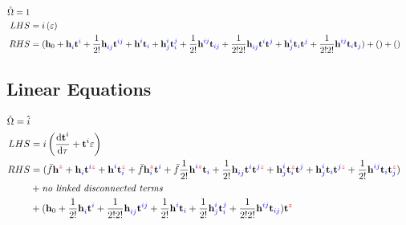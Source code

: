 \documentclass{article}
\newcommand{\bh}{\textbf{h}}
\newcommand{\bt}{\textbf{t}}
\newcommand{\down}[1]{\hat{#1}}
\begin{document}
%
%
%
%
%
%


%
%
%
%
%

\begin{align}\begin{split}
    \hat{\Omega} = 1
\\ LHS &=
    i\left(\varepsilon\right)
\\ RHS &=
%
%
(\bh_0 + \bh^{\blue{}\red{}}_{\blue{i}\red{}}\bt^{\blue{i}\red{}} + \frac{1}{2!}\bh^{\blue{}\red{}}_{\blue{ij}\red{}}\bt^{\blue{ij}\red{}} + \bh^{\blue{i}\red{}}_{\blue{}\red{}}\bt_{\blue{i}\red{}} + \bh^{\blue{i}\red{}}_{\blue{j}\red{}}\bt^{\blue{j}\red{}}_{\blue{i}\red{}} + \frac{1}{2!}\bh^{\blue{ij}\red{}}_{\blue{}\red{}}\bt_{\blue{ij}\red{}} + \frac{1}{2!2!}\bh^{\blue{}\red{}}_{\blue{ij}\red{}}\bt^{\blue{i}\red{}}\bt^{\blue{j}\red{}} + \bh^{\blue{i}\red{}}_{\blue{j}\red{}}\bt_{\blue{i}\red{}}\bt^{\blue{j}\red{}} + \frac{1}{2!2!}\bh^{\blue{ij}\red{}}_{\blue{}\red{}}\bt_{\blue{i}\red{}}\bt_{\blue{j}\red{}}) + () + ()
\end{split}\end{align}

%
%
%
%
%

\subsection{Linear Equations}

\begin{align}\begin{split}
    \hat{\Omega} = \down{i}
\\ LHS &=
    i\left(\dv{\bt^{i}_{}}{\tau} + \bt^{i}_{}\varepsilon\right)
\\ RHS &=
%
%
(\bar{f}\bh^{\blue{}\red{z}}_{\blue{}\red{}} + \bh^{\blue{}\red{}}_{\blue{i}\red{}}\bt^{\blue{i}\red{z}} + \bh^{\blue{i}\red{}}_{\blue{}\red{}}\bt^{\blue{}\red{z}}_{\blue{i}\red{}} + \bar{f}\bh^{\blue{}\red{z}}_{\blue{i}\red{}}\bt^{\blue{i}\red{}} + \bar{f}\frac{1}{2!}\bh^{\blue{i}\red{z}}_{\blue{}\red{}}\bt_{\blue{i}\red{}} + \frac{1}{2!}\bh^{\blue{}\red{}}_{\blue{ij}\red{}}\bt^{\blue{i}\red{}}\bt^{\blue{j}\red{z}} + \bh^{\blue{i}\red{}}_{\blue{j}\red{}}\bt^{\blue{}\red{z}}_{\blue{i}\red{}}\bt^{\blue{j}\red{}} + \bh^{\blue{i}\red{}}_{\blue{j}\red{}}\bt_{\blue{i}\red{}}\bt^{\blue{j}\red{z}} + \frac{1}{2!}\bh^{\blue{ij}\red{}}_{\blue{}\red{}}\bt_{\blue{i}\red{}}\bt^{\blue{}\red{z}}_{\blue{j}\red{}})
%
%
\\  &+
%
%
    \textit{no linked disconnected terms}
%
%
\\  &+
%
%
(\bh_0 + \frac{1}{2!}\bh^{\blue{}\red{}}_{\blue{i}\red{}}\bt^{\blue{i}\red{}} + \frac{1}{2!2!}\bh^{\blue{}\red{}}_{\blue{ij}\red{}}\bt^{\blue{ij}\red{}} + \frac{1}{2!}\bh^{\blue{i}\red{}}_{\blue{}\red{}}\bt_{\blue{i}\red{}} + \frac{1}{2!}\bh^{\blue{i}\red{}}_{\blue{j}\red{}}\bt^{\blue{j}\red{}}_{\blue{i}\red{}} + \frac{1}{2!2!}\bh^{\blue{ij}\red{}}_{\blue{}\red{}}\bt_{\blue{ij}\red{}})\bt^{\blue{}\red{z}}
\end{split}\end{align}
\end{document}
